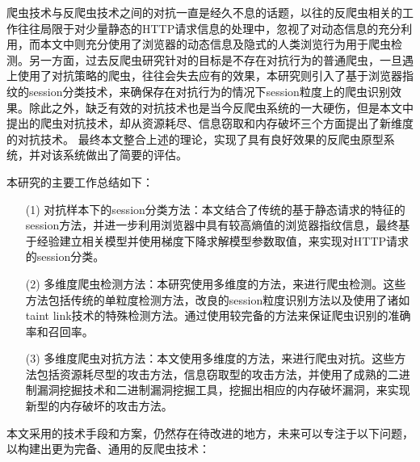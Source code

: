 \documentclass[doctor,privacy,twoside]{buaa_mac}
\begin{document}
%

%

%
\summary

爬虫技术与反爬虫技术之间的对抗一直是经久不息的话题，以往的反爬虫相关的工作往往局限于对少量静态的HTTP请求信息的处理中，忽视了对动态信息的充分利用，而本文中则充分使用了浏览器的动态信息及隐式的人类浏览行为用于爬虫检测。另一方面，过去反爬虫研究针对的目标是不存在对抗行为的普通爬虫，一旦遇上使用了对抗策略的爬虫，往往会失去应有的效果，本研究则引入了基于浏览器指纹的session分类技术，来确保存在对抗行为的情况下session粒度上的爬虫识别效果。除此之外，缺乏有效的对抗技术也是当今反爬虫系统的一大硬伤，但是本文中提出的爬虫对抗技术，却从资源耗尽、信息窃取和内存破坏三个方面提出了新维度的对抗技术。 最终本文整合上述的理论，实现了具有良好效果的反爬虫原型系统，并对该系统做出了简要的评估。

本研究的主要工作总结如下：
\begin{itemize}
\item[(1)] 对抗样本下的session分类方法：本文结合了传统的基于静态请求的特征的session方法，并进一步利用浏览器中具有较高熵值的浏览器指纹信息，最终基于经验建立相关模型并使用梯度下降求解模型参数取值，来实现对HTTP请求的session分类。

\item[(2)] 多维度爬虫检测方法：本研究使用多维度的方法，来进行爬虫检测。这些方法包括传统的单粒度检测方法，改良的session粒度识别方法以及使用了诸如taint link技术的特殊检测方法。通过使用较完备的方法来保证爬虫识别的准确率和召回率。

\item[(3)] 多维度爬虫对抗方法：本文使用多维度的方法，来进行爬虫对抗。这些方法包括资源耗尽型的攻击方法，信息窃取型的攻击方法，并使用了成熟的二进制漏洞挖掘技术和二进制漏洞挖掘工具，挖掘出相应的内存破坏漏洞，来实现新型的内存破坏的攻击方法。
\end{itemize}

本文采用的技术手段和方案，仍然存在待改进的地方，未来可以专注于以下问题，以构建出更为完备、通用的反爬虫技术：
\end{document}
